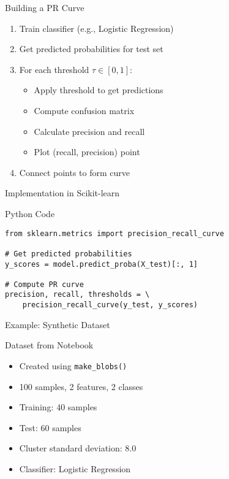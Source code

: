 \documentclass{beamer}
\begin{document}
\begin{frame}{Building a PR Curve}
\begin{enumerate}
    \item Train classifier (e.g., Logistic Regression)
    \item Get predicted probabilities for test set
    \item For each threshold $\tau \in [0, 1]$:
    \begin{itemize}
        \item Apply threshold to get predictions
        \item Compute confusion matrix
        \item Calculate precision and recall
        \item Plot (recall, precision) point
    \end{itemize}
    \item Connect points to form curve
\end{enumerate}
\end{frame}

\begin{frame}[fragile]{Implementation in Scikit-learn}
\begin{block}{Python Code}
\begin{verbatim}
from sklearn.metrics import precision_recall_curve

# Get predicted probabilities
y_scores = model.predict_proba(X_test)[:, 1]

# Compute PR curve
precision, recall, thresholds = \
    precision_recall_curve(y_test, y_scores)
\end{verbatim}
\end{block}
\end{frame}

\begin{frame}{Example: Synthetic Dataset}
\begin{examplebox}{Dataset from Notebook}
\begin{itemize}
    \item Created using \texttt{make\_blobs()}
    \item 100 samples, 2 features, 2 classes
    \item Training: 40 samples
    \item Test: 60 samples
    \item Cluster standard deviation: 8.0
    \item Classifier: Logistic Regression
\end{itemize}
\end{examplebox}
\end{frame}
\end{document}
